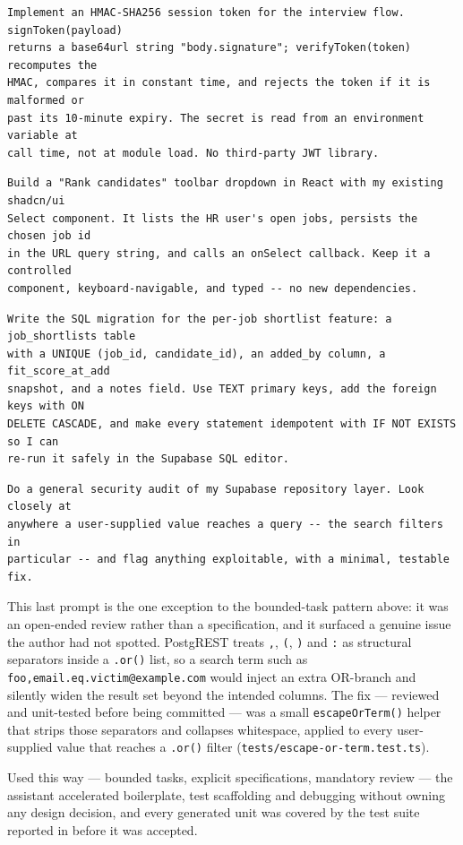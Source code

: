 \begin{lstlisting}[caption={Implementing a small, security-sensitive utility to a spec.},label={lst:dev-token}]
Implement an HMAC-SHA256 session token for the interview flow. signToken(payload)
returns a base64url string "body.signature"; verifyToken(token) recomputes the
HMAC, compares it in constant time, and rejects the token if it is malformed or
past its 10-minute expiry. The secret is read from an environment variable at
call time, not at module load. No third-party JWT library.
\end{lstlisting}

\begin{lstlisting}[caption={Building an accessible UI component from shadcn primitives.},label={lst:dev-ui}]
Build a "Rank candidates" toolbar dropdown in React with my existing shadcn/ui
Select component. It lists the HR user's open jobs, persists the chosen job id
in the URL query string, and calls an onSelect callback. Keep it a controlled
component, keyboard-navigable, and typed -- no new dependencies.
\end{lstlisting}

\begin{lstlisting}[caption={Writing an idempotent SQL migration for a new feature.},label={lst:dev-sql}]
Write the SQL migration for the per-job shortlist feature: a job_shortlists table
with a UNIQUE (job_id, candidate_id), an added_by column, a fit_score_at_add
snapshot, and a notes field. Use TEXT primary keys, add the foreign keys with ON
DELETE CASCADE, and make every statement idempotent with IF NOT EXISTS so I can
re-run it safely in the Supabase SQL editor.
\end{lstlisting}

\begin{lstlisting}[caption={Open-ended security audit of the Supabase repository layer.},label={lst:dev-audit}]
Do a general security audit of my Supabase repository layer. Look closely at
anywhere a user-supplied value reaches a query -- the search filters in
particular -- and flag anything exploitable, with a minimal, testable fix.
\end{lstlisting}

This last prompt is the one exception to the bounded-task pattern above: it was
an open-ended review rather than a specification, and it surfaced a genuine
issue the author had not spotted. PostgREST treats \texttt{,}, \texttt{(},
\texttt{)} and \texttt{:} as structural separators inside a \texttt{.or()}
list, so a search term such as \texttt{foo,email.eq.victim@example.com} would
inject an extra OR-branch and silently widen the result set beyond the intended
columns. The fix --- reviewed and unit-tested before being committed --- was a
small \texttt{escapeOrTerm()} helper that strips those separators and collapses
whitespace, applied to every user-supplied value that reaches a \texttt{.or()}
filter (\texttt{tests/escape-or-term.test.ts}).

Used this way --- bounded tasks, explicit specifications, mandatory review ---
the assistant accelerated boilerplate, test scaffolding and debugging without
owning any design decision, and every generated unit was covered by the test
suite reported in  before it was accepted.
